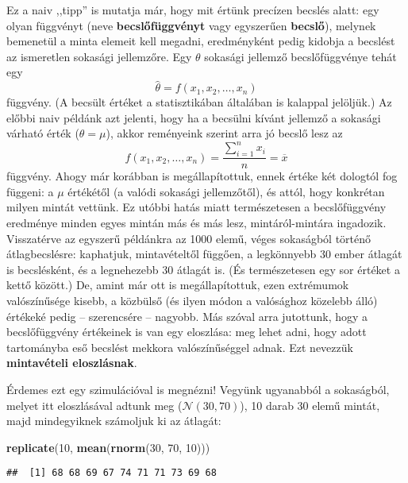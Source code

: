 \documentclass[]{book}
\newenvironment{Shaded}{\begin{snugshade}}{\end{snugshade}}
\newcommand{\DecValTok}[1]{\textcolor[rgb]{0.00,0.00,0.81}{#1}}
\newcommand{\KeywordTok}[1]{\textcolor[rgb]{0.13,0.29,0.53}{\textbf{#1}}}
\newcommand{\NormalTok}[1]{#1}
\begin{document}
Ez a naiv ,,tipp'' is mutatja már, hogy mit értünk precízen becslés alatt: egy olyan függvényt (neve \textbf{becslőfüggvényt} vagy egyszerűen \textbf{becslő}), melynek bemenetül a minta elemeit kell megadni, eredményként pedig kidobja a becslést az ismeretlen sokasági jellemzőre. Egy \(\theta\) sokasági jellemző becslőfüggvénye tehát egy
\[
    \widehat{\theta} = f\left(x_1,x_2,\ldots,x_n\right)
\]
függvény. (A becsült értéket a statisztikában általában is kalappal jelöljük.) Az előbbi naiv példánk azt jelenti, hogy ha a becsülni kívánt jellemző a sokasági várható érték (\(\theta=\mu\)), akkor reményeink szerint arra jó becslő lesz az
\[
    f\left(x_1,x_2,\ldots,x_n\right)=\frac{\sum_{i=1}^n x_i}{n}=\overline{x}
\]
függvény. Ahogy már korábban is megállapítottuk, ennek értéke két dologtól fog függeni: a \(\mu\) értékétől (a valódi sokasági jellemzőtől), és attól, hogy konkrétan milyen mintát vettünk. Ez utóbbi hatás miatt természetesen a becslőfüggvény eredménye minden egyes mintán más és más lesz, mintáról-mintára ingadozik. Visszatérve az egyszerű példánkra az 1000 elemű, véges sokaságból történő átlagbecslésre: kaphatjuk, mintavételtől függően, a legkönnyebb 30 ember átlagát is becslésként, és a legnehezebb 30 átlagát is. (És természetesen egy sor értéket a kettő között.) De, amint már ott is megállapítottuk, ezen extrémumok valószínűsége kisebb, a közbülső (és ilyen módon a valósághoz közelebb álló) értékeké pedig -- szerencsére -- nagyobb. Más szóval arra jutottunk, hogy a becslőfüggvény értékeinek is van egy eloszlása: meg lehet adni, hogy adott tartományba eső becslést mekkora valószínűséggel adnak. Ezt nevezzük \textbf{mintavételi eloszlásnak}.

Érdemes ezt egy szimulációval is megnézni! Vegyünk ugyanabból a sokaságból, melyet itt eloszlásával adtunk meg (\(\mathcal{N}\left(30,70\right)\)), 10 darab 30 elemű mintát, majd mindegyiknek számoljuk ki az átlagát:

\begin{Shaded}
\begin{Highlighting}[]
\KeywordTok{replicate}\NormalTok{(}\DecValTok{10}\NormalTok{, }\KeywordTok{mean}\NormalTok{(}\KeywordTok{rnorm}\NormalTok{(}\DecValTok{30}\NormalTok{, }\DecValTok{70}\NormalTok{, }\DecValTok{10}\NormalTok{)))}
\end{Highlighting}
\end{Shaded}

\begin{verbatim}
##  [1] 68 68 69 67 74 71 71 73 69 68
\end{verbatim}
\end{document}
